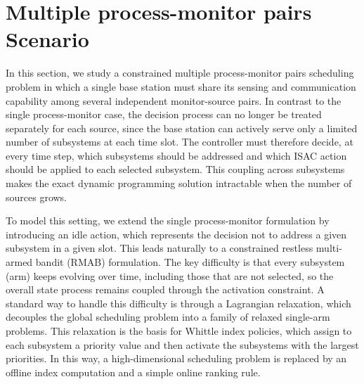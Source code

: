 \documentclass[letterpaper,journal]{IEEEtran}
\begin{document}
\begin{table}[ht]
\centering
\caption{Minimum truncation level $A$ satisfying \eqref{eq:truncation-threshold-2}.}
\label{tab:truncation_levels_normalized}
\end{table}


\section{Multiple process-monitor pairs Scenario}\label{sec:multi-source-scenario}

In this section, we study a constrained multiple process-monitor pairs scheduling problem in which a single base station must share its sensing and communication capability among several independent monitor-source pairs. In contrast to the single process-monitor case, the decision process can no longer be treated separately for each source, since the base station can actively serve only a limited number of subsystems at each time slot. The controller must therefore decide, at every time step, which subsystems should be addressed and which ISAC action should be applied to each selected subsystem. This coupling across subsystems makes the exact dynamic programming solution intractable when the number of sources grows.

To model this setting, we extend the single process-monitor formulation by introducing an idle action, which represents the decision not to address a given subsystem in a given slot. This leads naturally to a constrained restless multi-armed bandit (RMAB) formulation. The key difficulty is that every subsystem (arm) keeps evolving over time, including those that are not selected, so the overall state process remains coupled through the activation constraint. A standard way to handle this difficulty is through a Lagrangian relaxation, which decouples the global scheduling problem into a family of relaxed single-arm problems. This relaxation is the basis for Whittle index policies, which assign to each subsystem a priority value and then activate the subsystems with the largest priorities. In this way, a high-dimensional scheduling problem is replaced by an offline index computation and a simple online ranking rule.
\end{document}
